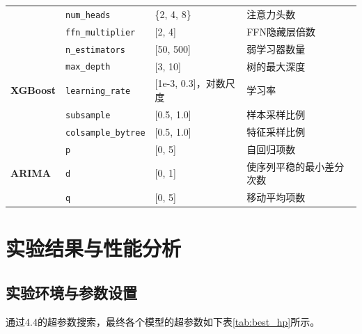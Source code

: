 \documentclass[UTF8,AutoFakeBold=1,AutoFakeSlant,zihao=-4]{SCAU}
\begin{document}
\begin{table}[htbp]
\begin{tabularx}{\textwidth}{@{}lllX@{}}
                                         & \texttt{num\_heads}       & \{2, 4, 8\}            & 注意力头数                                             \\
                                         & \texttt{ffn\_multiplier}  & [2, 4]                 & FFN隐藏层倍数                                         \\
    \midrule
    \multirow{5}{*}{\textbf{XGBoost}}    & \texttt{n\_estimators}    & [50, 500]              & 弱学习器数量                                           \\
                                         & \texttt{max\_depth}       & [3, 10]                & 树的最大深度                                           \\
                                         & \texttt{learning\_rate}   & [1e-3, 0.3]，对数尺度  & 学习率                                                 \\
                                         & \texttt{subsample}        & [0.5, 1.0]             & 样本采样比例                                           \\
                                         & \texttt{colsample\_bytree} & [0.5, 1.0]           & 特征采样比例                                           \\
    \midrule
    \multirow{3}{*}{\textbf{ARIMA}}      & \texttt{p}                & [0, 5]                 & 自回归项数                                             \\
                                         & \texttt{d}                & [0, 1]                 & 使序列平稳的最小差分次数                               \\
                                         & \texttt{q}                & [0, 5]                 & 移动平均项数                                           \\
    \bottomrule
  \end{tabularx}
\end{table}

\section{实验结果与性能分析}
\subsection{实验环境与参数设置}
通过4.4的超参数搜索，最终各个模型的超参数如下表\ref{tab:best_hp}所示。
\end{document}

